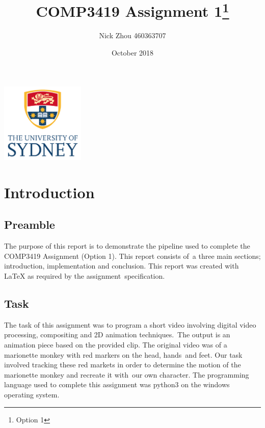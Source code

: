 \documentclass[12pt,a4paper]{article}
\begin{document}
    \begin{titlepage}
        \centering
        \title{COMP3419 Assignment 1\thanks{Option 1}}
        \author{Nick Zhou 460363707}
        \date{October 2018}
        \maketitle
        \centering
        \includegraphics[width=4cm]{usyd}\\[2cm]
    \end{titlepage}

    \begin{tableofcontents}
        \tableofcontents
    \end{tableofcontents}

    \section{Introduction}

      \subsection{Preamble}

      The purpose of this report is to demonstrate the pipeline used to complete the COMP3419 Assignment (Option 1). This report consists of\
      a three main sections; introduction, implementation and conclusion. This report was created with \LaTeX{} as required by the assignment\
      specification.\\

      \subsection{Task}

      The task of this assignment was to program a short video involving digital video processing, compositing and 2D animation techniques.\
      The output is an animation piece based on the provided clip. The original video was of a marionette monkey with red markers on the head, hands\
      and feet. Our task involved tracking these red markets in order to determine the motion of the marionette monkey and recreate it with\
      our own character. The programming language used to complete this assignment was python3 on the windows operating system.\\
\end{document}
